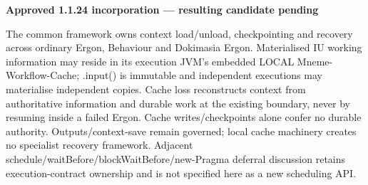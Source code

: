 \par\medskip\textbf{Approved 1.1.24 incorporation — resulting candidate pending}\par


The common framework owns context load/unload, checkpointing and recovery across ordinary Ergon, Behaviour and Dokimasia Ergon. Materialised IU working information may reside in its execution JVM's embedded LOCAL Mneme-Workflow-Cache; .input() is immutable and independent executions may materialise independent copies. Cache loss reconstructs context from authoritative information and durable work at the existing boundary, never by resuming inside a failed Ergon. Cache writes/checkpoints alone confer no durable authority. Outputs/context-save remain governed; local cache machinery creates no specialist recovery framework. Adjacent schedule/waitBefore/blockWaitBefore/new-Pragma deferral discussion retains execution-contract ownership and is not specified here as a new scheduling API.



